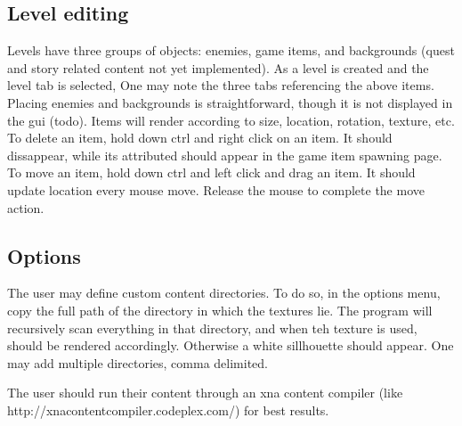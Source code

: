 \documentclass[letterpaper]{article}
\begin{document}
\subsection{Level editing}
Levels have three groups of objects: enemies, game items, and backgrounds (quest and story related content not yet implemented). As a level is created and the level tab is selected, One may note the three tabs referencing the above items. Placing enemies and backgrounds is straightforward, though it is not displayed in the gui (todo). Items will render according to size, location, rotation, texture, etc. 
To delete an item, hold down ctrl and right click on an item. It should dissappear, while its attributed should appear in the game item spawning page.
To move an item, hold down ctrl and left click and drag an item. It should update location every mouse move. Release the mouse to complete the move action.

\subsection{Options}
The user may define custom content directories. To do so, in the options menu, copy the full path of the directory in which the textures lie. The program will recursively scan everything in that directory, and when teh texture is used, should be rendered accordingly. Otherwise a white sillhouette should appear. One may add multiple directories, comma delimited.

The user should run their content through an xna content compiler (like http://xnacontentcompiler.codeplex.com/) for best results.
\end{document}
